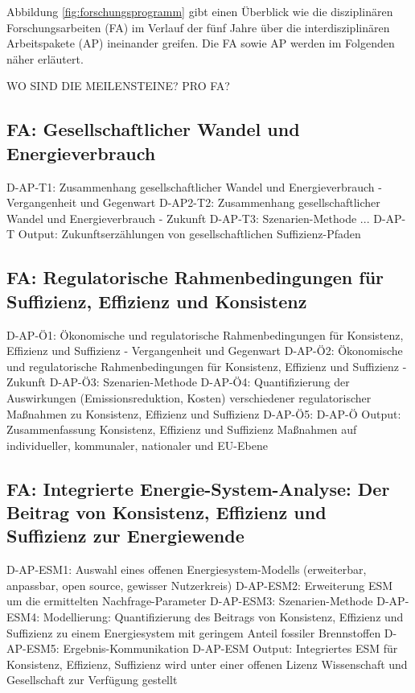 \documentclass[a4paper,11pt,twoside]{scrartcl}
\begin{document}
Abbildung \ref{fig:forschungsprogramm} gibt einen Überblick wie die disziplinären Forschungsarbeiten (FA) im Verlauf der fünf Jahre über die interdisziplinären Arbeitspakete (AP) ineinander greifen. Die FA sowie AP werden im Folgenden näher erläutert.

WO SIND DIE MEILENSTEINE? PRO FA?

\subsection*{FA: Gesellschaftlicher Wandel und Energieverbrauch}
D-AP-T1: Zusammenhang gesellschaftlicher Wandel und Energieverbrauch - Vergangenheit und Gegenwart
D-AP2-T2: Zusammenhang gesellschaftlicher Wandel und Energieverbrauch - Zukunft
D-AP-T3: Szenarien-Methode
...
D-AP-T Output: Zukunftserzählungen von gesellschaftlichen Suffizienz-Pfaden

\subsection*{FA: Regulatorische Rahmenbedingungen für Suffizienz, Effizienz und Konsistenz}
D-AP-Ö1: Ökonomische und regulatorische Rahmenbedingungen für Konsistenz, Effizienz und Suffizienz - Vergangenheit und Gegenwart
D-AP-Ö2: Ökonomische und regulatorische Rahmenbedingungen für Konsistenz, Effizienz und Suffizienz - Zukunft
D-AP-Ö3: Szenarien-Methode
D-AP-Ö4: Quantifizierung der Auswirkungen (Emissionsreduktion, Kosten) verschiedener regulatorischer Maßnahmen zu Konsistenz, Effizienz und Suffizienz
D-AP-Ö5: 
D-AP-Ö Output: Zusammenfassung Konsistenz, Effizienz und Suffizienz Maßnahmen auf individueller, kommunaler, nationaler und EU-Ebene

\subsection*{FA: Integrierte Energie-System-Analyse: Der Beitrag von Konsistenz, Effizienz und Suffizienz zur Energiewende}
D-AP-ESM1: Auswahl eines offenen Energiesystem-Modells (erweiterbar, anpassbar, open source, gewisser Nutzerkreis)
D-AP-ESM2: Erweiterung ESM um die ermittelten Nachfrage-Parameter
D-AP-ESM3: Szenarien-Methode
D-AP-ESM4: Modellierung: Quantifizierung des Beitrags von Konsistenz, Effizienz und Suffizienz zu einem Energiesystem mit geringem Anteil fossiler Brennstoffen
D-AP-ESM5: Ergebnis-Kommunikation
D-AP-ESM Output: Integriertes ESM für Konsistenz, Effizienz, Suffizienz wird unter einer offenen Lizenz Wissenschaft und Gesellschaft zur Verfügung gestellt
\end{document}
